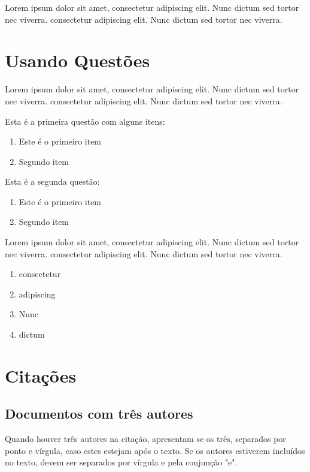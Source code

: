 Lorem ipsum dolor sit amet, consectetur adipiscing elit. Nunc dictum sed tortor nec viverra. consectetur adipiscing elit. Nunc dictum sed tortor nec viverra.

\section{Usando Questões}


Lorem ipsum dolor sit amet, consectetur adipiscing elit. Nunc dictum sed tortor nec viverra. consectetur adipiscing elit. Nunc dictum sed tortor nec viverra.

\begin{questao}
	\item Esta é a primeira questão com alguns itens:
		\begin{enumerate}
			\item Este é o primeiro item
			\item Segundo item
		\end{enumerate}
	\item Esta é a segunda questão:
		\begin{enumerate}
			\item Este é o primeiro item
			\item Segundo item
		\end{enumerate}
	\item Lorem ipsum dolor sit amet, consectetur adipiscing elit. Nunc dictum sed tortor nec viverra. consectetur adipiscing elit. Nunc dictum sed tortor nec viverra.
		\begin{enumerate}
			\item consectetur
			\item adipiscing
			\item Nunc
			\item dictum
		\end{enumerate}
\end{questao}

\section{Citações}

\subsection{Documentos com três autores}

Quando houver três autores na citação, apresentam se os três, separados por ponto e vírgula, caso estes estejam após o texto. Se os autores estiverem incluídos no texto, devem ser separados por vírgula e pela conjunção "e".

